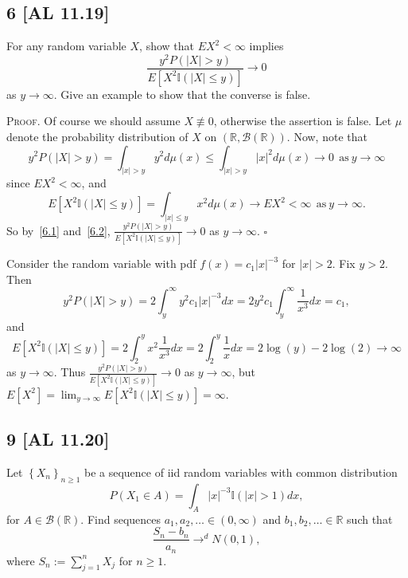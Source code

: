 \documentclass[12pt]{article}
\newcounter{ProofCounter}
\newenvironment{Proof}{\stepcounter{ProofCounter}\textsc{Proof.}}{\hfill$\square$}
\begin{document}
\subsection*{6 [AL 11.19]}
\begin{tcolorbox}
  For any random variable $X$, show that $EX^{2} < \infty$ implies 
  \[
    \frac{y^{2}P(|X| > y)}{E[X^{2}\mathbb{I} (|X| \leq y)]} \rightarrow 0
  \]
  as $y \rightarrow\infty$. Give an example to show that the converse is false.
\end{tcolorbox}
\begin{Proof}
  Of course we should assume $X \not\equiv 0$, otherwise the assertion is false. Let $\mu$ denote the probability distribution of $X$ on
  $(\mathbb{R},\mathcal{B}(\mathbb{R}))$. Now, note that
  \begin{equation}
    y^{2}P(|X| > y) = \int_{|x| > y}y^{2}d\mu(x) \leq \int_{|x| > y}|x|^{2}d\mu(x) \rightarrow 0\ \ \text{as}\ y \rightarrow \infty
    \label{6.1}
  \end{equation}
  since $EX^{2} < \infty$, and 
  \begin{equation}
    E[X^{2}\mathbb{I} (|X| \leq y)] = \int_{|x| \leq y}x^{2}d\mu(x) \rightarrow EX^{2} < \infty \ \ \text{as} \ y \rightarrow \infty.
    \label{6.2}
  \end{equation}
  So by~\eqref{6.1} and~\eqref{6.2}, $\frac{y^{2}P(|X| > y)}{E[X^{2}\mathbb{I} (|X| \leq y)]} \rightarrow 0$ as $y \rightarrow \infty$.
\end{Proof}

\vspace{5mm}
Consider the random variable with pdf $f(x) = c_{1}|x|^{-3}$ for $|x| > 2$. Fix $y > 2$. Then
\[ y^{2}P(|X| > y) = 2\int_{y}^{\infty}y^{2}c_{1}|x|^{-3}dx = 2y^{2}c_{1}\int_{y}^{\infty}\frac{1}{x^{3}}dx = c_{1}, \]
and 
\[ E[X^{2}\mathbb{I} (|X| \leq y)] = 2\int_{2}^{y}x^{2}\frac{1}{x^{3}}dx = 2\int_{2}^{y}\frac{1}{x}dx = 2\log(y) - 2\log(2) \rightarrow \infty \]
as $y \rightarrow \infty$. Thus $\frac{y^{2}P(|X| > y)}{E[X^{2}\mathbb{I} (|X| \leq y)]} \rightarrow 0$ as $y \rightarrow \infty$, but 
$E[X^{2}] = \lim_{y\rightarrow\infty}E[X^{2}\mathbb{I} (|X| \leq y)] = \infty$.




\newpage
\subsection*{9 [AL 11.20]}
\begin{tcolorbox}
  Let $\left\{ X_n \right\}_{n\geq 1}$ be a sequence of iid random variables with common distribution
  \[
    P(X_1 \in A) = \int_{A}|x|^{-3}\mathbb{I} (|x| > 1)dx,
  \]
  for $A \in \mathcal{B}(\mathbb{R})$. Find sequences $a_1,a_2,\hdots \in (0,\infty)$ and $b_1,b_2,\hdots \in \mathbb{R}$ such that 
  \[
    \frac{S_n - b_n}{a_n} \rightarrow^{d} N(0,1),
  \]
  where $S_n := \sum_{j=1}^{n}X_j$ for $n \geq 1$.
\end{tcolorbox}
\end{document}
